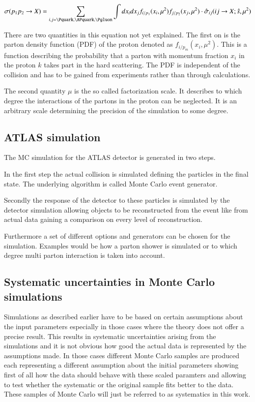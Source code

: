 \begin{align}
	\sigma ( p_1 p_2 \rightarrow X ) = \sum_{i,j = \Pquark, \APquark, \Pgluon} \int dx_i dx_j f_{i/p_1} ( x_i, \mu^2 ) f_{j/p_2} ( x_j, \mu^2 ) \cdot \hat{\sigma}_{ij} ( ij \rightarrow X; \hat{s}, \mu^2 )
\end{align}

There are two quantities in this equation not yet explained.
The first on is the parton density function (PDF) of the proton denoted as $f_{i/p_m} ( x_i, \mu^2 )$. This is a function describing the probability that a parton with momentum fraction $x_i$ in the proton $k$ takes part in the hard scattering. The PDF is independent of the collision and has to be gained from experiments rather than through calculations.

The second quantity $\mu$ is the so called factorization scale. It describes to which degree the interactions of the partons in the proton can be neglected. It is an arbitrary scale determining the precision of the simulation to some degree.

\subsection{ATLAS simulation}

The MC simulation for the ATLAS detector is generated in two steps.~\cite{atlasmontecarlo}

In the first step the actual collision is simulated defining the particles in the final state. The underlying algorithm is called Monte Carlo event generator.

Secondly the response of the detector to these particles is simulated by the detector simulation allowing objects to be reconstructed from the event like from actual data gaining a comparison on every level of reconstruction.

Furthermore a set of different options and generators can be chosen for the simulation. Examples would be how a parton shower is simulated or to which degree multi parton interaction is taken into account.

\subsection{Systematic uncertainties in Monte Carlo simulations}
\label{sec:systmc}

Simulations as described earlier have to be based on certain assumptions about the input parameters especially in those cases where the theory does not offer a precise result. This results in systematic uncertainties arising from the simulations and it is not obvious how good the actual data is represented by the assumptions made.
In those cases different Monte Carlo samples are produced each representing a different assumption about the initial parameters showing first of all how the data should behave with these scaled paramters and allowing to test whether the systematic or the original sample fits better to the data. 
These samples of Monte Carlo will just be referred to as systematics in this work.

